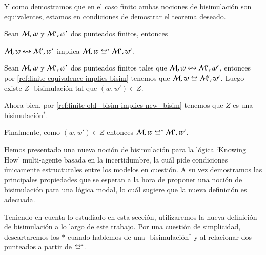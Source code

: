 Y como demostramos que en el caso finito ambas nociones de bisimulación son equivalentes, estamos en condiciones de demostrar el teorema deseado. 


\begin{teorema}
    Sean $\mathcal{M},w$ y $\mathcal{M}',w'$ dos \ultss punteados finitos, entonces
    \begin{center}
        $\mathcal{M},w \mathrel{\leftrightsquigarrow} \mathcal{M}', w'$ implica $\model,w \bisim^* \model', w'$.
    \end{center}
\end{teorema}

\begin{demostracion}
    Sean $\mathcal{M},w$ y $\mathcal{M}',w'$ dos \ultss punteados finitos tales que $\mathcal{M},w \mathrel{\leftrightsquigarrow} \mathcal{M}', w'$, entonces por \ref{ref:finite-equivalence-implies-bisim}
    tenemos que $\model,w \bisim \model', w'$. Luego existe $Z$ \KHilogic-bisimulación tal que $(w,w') \in Z$.

    Ahora bien, por \ref{ref:finite-old_bisim-implies-new_bisim} tenemos que $Z$ es una \KHilogic-bisimulación$^*$.

    Finalmente, como $(w,w') \in Z$ entonces $\model,w \bisim^* \model', w'$.
\end{demostracion}

Hemos presentado una nueva noción de bisimulación para la lógica `Knowing How' multi-agente basada en la incertidumbre, la 
cuál pide condiciones únicamente estructurales entre los modelos en cuestión. A su vez demostramos las principales propiedades que se 
esperan a la hora de proponer una noción de bisimulación para una lógica modal, lo cuál sugiere que la nueva definición es adecuada.

Teniendo en cuenta lo estudiado en esta sección, utilizaremos la nueva definición de bisimulación a lo largo de este trabajo.
Por una cuestión de simplicidad, descartaremos los $*$ cuando hablemos de una \KHilogic-bisimulación$^*$ y 
al relacionar dos \ultss punteados a partir de $\bisim^*$.  


